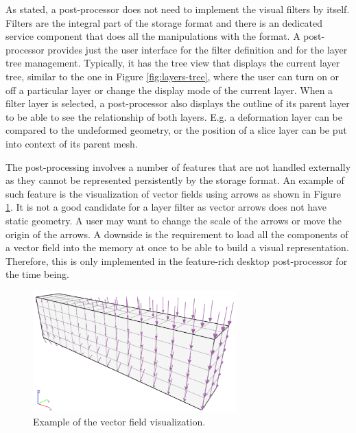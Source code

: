 As stated, a post-processor does not need to implement the visual filters by itself. Filters are the integral part of the storage format and there is an dedicated service component that does all the manipulations with the format. A post-processor provides just the user interface for the filter definition and for the layer tree management. Typically, it has the tree view that displays the current layer tree, similar to the one in Figure \ref{fig:layers-tree}, where the user can turn on or off a particular layer or change the display mode of the current layer. When a filter layer is selected, a post-processor also displays the outline of its parent layer to be able to see the relationship of both layers. E.g. a deformation layer can be compared to the undeformed geometry, or the position of a slice layer can be put into context of its parent mesh.

The post-processing involves a number of features that are not handled externally as they cannot be represented persistently by the storage format. An example of such feature is the visualization of vector fields using arrows as shown in Figure \ref{fig:beam-vectors}. It is not a good candidate for a layer filter as vector arrows does not have static geometry. A user may want to change the scale of the arrows or move the origin of the arrows. A downside is the requirement to load all the components of a vector field into the memory at once to be able to build a visual representation. Therefore, this is only implemented in the feature-rich desktop post-processor for the time being.

\begin{figure}[H]
    \centering
    \includegraphics[width=0.7\textwidth]{figures/chapter-data-management/beam-vectors}
    \decoRule
    \caption{Example of the vector field visualization.}
    \label{fig:beam-vectors}
\end{figure}

